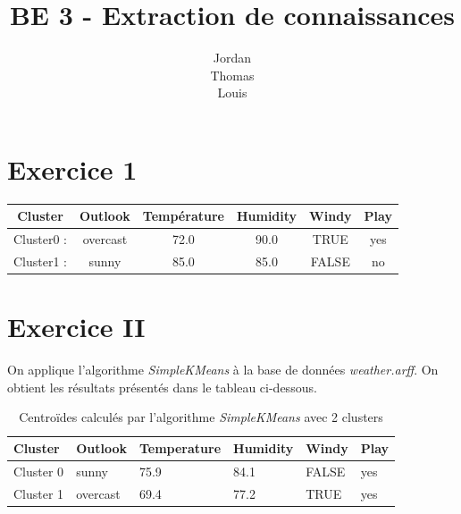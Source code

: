 \documentclass[a4paper, 11pt]{report}
\begin{document}
        \title{BE 3 - Extraction de connaissances}
        \author{Jordan \\ Thomas \\ Louis }

        \maketitle


        \section{Exercice 1}
        \begin{table}[h!]
            \centering
        	\begin{tabular}{|c|c|c|c|c|c|}
        		\hline
        		Cluster & Outlook & Température & Humidity & Windy & Play \\
        		\hline
        		Cluster0 : & overcast & 72.0 & 90.0 & TRUE & yes \\
        		\hline
        		Cluster1 : & sunny & 85.0 & 85.0 & FALSE & no \\
        		\hline
        	\end{tabular}
        \end{table}
        \section{Exercice II}
        On applique l'algorithme \emph{SimpleKMeans} à la base de données \emph{weather.arff}. On obtient les résultats présentés dans le tableau ci-dessous.
        
        \begin{table}[h!]
        \centering
        \begin{tabular}{| l | l | l | l | l | l |}
        \hline
        Cluster & Outlook & Temperature & Humidity & Windy & Play \\
        \hline
        Cluster 0 & sunny & 75.9 & 84.1 & FALSE & yes \\
        \hline
        Cluster 1 & overcast & 69.4 & 77.2 & TRUE & yes \\
        \hline

        \end{tabular}
        \caption{Centroïdes calculés par l'algorithme \emph{SimpleKMeans} avec 2 clusters}
        \label{tab:exo_2}
        \end{table}
        
\end{document}
